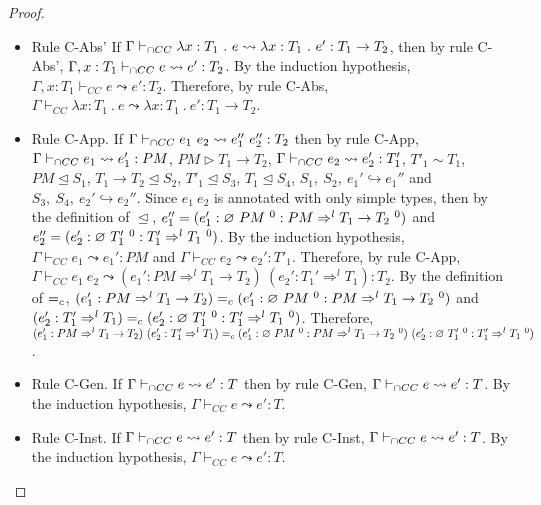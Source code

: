\documentclass[a4paper]{article}
\begin{document}
\begin{proof}
\begin{itemize}
    \item Rule C-Abs'
    If $\Gamma \vdash_{\cap CC} \lambda x : T_1\ .\ e \leadsto \lambda x : T_1\ .\ e' : T_1 \rightarrow T_2$, then by rule C-Abs', $\Gamma, x : T_1 \vdash_{\cap CC} e \leadsto e' : T_2$.
    By the induction hypothesis, $\Gamma, x : T_1 \vdash_{CC} e \leadsto e' : T_2$.
    Therefore, by rule C-Abs, $\Gamma \vdash_{CC} \lambda x : T_1\ .\ e \leadsto \lambda x : T_1\ .\ e' : T_1 \rightarrow T_2$.
    \item Rule C-App.
    If $\Gamma \vdash_{\cap CC} e_1\ e_2 \leadsto e_1''\ e_2'' : T_2$ then by rule C-App, $\Gamma \vdash_{\cap CC} e_1 \leadsto e_1' : PM$, $PM \rhd T_1 \rightarrow T_2$, $\Gamma \vdash_{\cap CC} e_2 \leadsto e_2' : T'_1$, $T'_1 \sim T_1$, $PM \trianglelefteq S_1$, $T_1 \rightarrow T_2 \trianglelefteq S_2$, $T'_1 \trianglelefteq S_3$, $T_1 \trianglelefteq S_4$, $S_1,\ S_2,\ e_1' \hookrightarrow e_1''$ and $S_3,\ S_4,\ e_2' \hookrightarrow e_2''$.
    Since $e_1\ e_2$ is annotated with only simple types, then by the definition of $\trianglelefteq$, $e_1'' = (e_1' : \varnothing\ PM\ ^{0} : PM \Rightarrow^l T_1 \rightarrow T_2\ ^0)$ and $e_2'' = (e_2' : \varnothing\ T_1'\ ^{0} : T_1' \Rightarrow^l T_1\ ^0)$.
    By the induction hypothesis, $\Gamma \vdash_{CC} e_1 \leadsto e_1' : PM$ and $\Gamma \vdash_{CC} e_2 \leadsto e_2' : T'_1$.
    Therefore, by rule C-App, $\Gamma \vdash_{CC} e_1\ e_2 \leadsto (e_1' : PM \Rightarrow^l T_1 \rightarrow T_2)\ (e_2' : T_1' \Rightarrow^l T_1) : T_2$.
    By the definition of $=_c$, $(e_1' : PM \Rightarrow^l T_1 \rightarrow T_2) =_c (e_1' : \varnothing\ PM\ ^{0} : PM \Rightarrow^l T_1 \rightarrow T_2\ ^0)$ and $(e_2' : T_1' \Rightarrow^l T_1) =_c (e_2' : \varnothing\ T_1'\ ^{0} : T_1' \Rightarrow^l T_1\ ^0)$.
    Therefore, $(e_1' : PM \Rightarrow^l T_1 \rightarrow T_2)\ (e_2' : T_1' \Rightarrow^l T_1) \equalityCasts (e_1' : \emptycast{PM}{0} : PM \Rightarrow^l T_1 \rightarrow T_2\ ^0)\ (e_2' : \emptycast{T_1'}{0} : T_1' \Rightarrow^l T_1\ ^0)$.
    \item Rule C-Gen.
    If $\Gamma \vdash_{\cap CC} e \leadsto e' : T$ then by rule C-Gen, $\Gamma \vdash_{\cap CC} e \leadsto e' : T$.
    By the induction hypothesis, $\Gamma \vdash_{CC} e \leadsto e' : T$.
    \item Rule C-Inst.
    If $\Gamma \vdash_{\cap CC} e \leadsto e' : T$ then by rule C-Inst, $\Gamma \vdash_{\cap CC} e \leadsto e' : T$.
    By the induction hypothesis, $\Gamma \vdash_{CC} e \leadsto e' : T$.
\end{itemize}
\end{proof}
\end{document}
